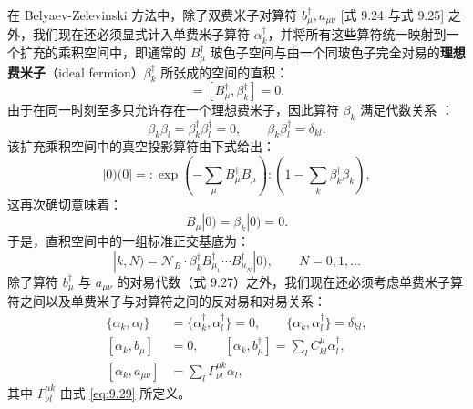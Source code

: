 在 Belyaev-Zelevinski 方法中，除了双费米子对算符 $b^{\dagger}_{\mu},a_{\mu\nu}$
{[}式 9.24 与式 9.25{]} 之外，我们现在还必须显式计入单费米子算符 $\alpha^{\dagger}_{k}$，并将所有这些算符统一映射到一个扩充的乘积空间中，即通常的
$B^{\dagger}_{\mu}$ 玻色子空间与由一个同玻色子完全对易的\textbf{理想费米子}（ideal fermion）$\beta^{\dagger}_{k}$
所张成的空间的直积：
\begin{equation}
[B_{\mu},\beta^{\dagger}_{k}]=[B^{\dagger}_{\mu},\beta^{\dagger}_{k}]=0.\label{eq:9.124}
\end{equation}
由于在同一时刻至多只允许存在一个理想费米子，因此算符 $\beta_{k}$ 满足代数关系 \cite{Ok74}：
\begin{equation}
\beta_{k}\beta_{l}=\beta^{\dagger}_{k}\beta^{\dagger}_{l}=0,\qquad\beta_{k}\beta^{\dagger}_{l}=\delta_{kl}.\label{eq:9.125}
\end{equation}
该扩充乘积空间中的真空投影算符由下式给出：
\begin{equation}
|0)(0|={:}\exp\left(-\sum_{\mu}B^{\dagger}_{\mu}B_{\mu}\right){:}\left(1-\sum_{k}\beta^{\dagger}_{k}\beta_{k}\right),\label{eq:9.126}
\end{equation}
这再次确切意味着：
\begin{equation}
B_{\mu}|0)=\beta_{k}|0)=0.\label{eq:9.127}
\end{equation}
于是，直积空间中的一组标准正交基底为：
\begin{equation}
|k,N)=\mathscr{N}_{B}\cdot\beta^{\dagger}_{k}B^{\dagger}_{\mu_{1}}\cdots B^{\dagger}_{\mu_{N}}|0),\qquad N=0,1,\ldots\label{eq:9.128}
\end{equation}
除了算符 $b^{\dagger}_{\mu}$ 与 $a_{\mu\nu}$ 的对易代数（式 9.27）之外，我们现在还必须考虑单费米子算符之间以及单费米子与对算符之间的反对易和对易关系：
\begin{align}
\{\alpha_{k},\alpha_{l}\} & =\{\alpha^{\dagger}_{k},\alpha^{\dagger}_{l}\}=0,\qquad\{\alpha_{k},\alpha^{\dagger}_{l}\}=\delta_{kl},\nonumber \\{}
[\alpha_{k},b_{\mu}] & =0,\qquad[\alpha_{k},b^{\dagger}_{\mu}]=\sum_{l}C^{\mu}_{kl}\alpha^{\dagger}_{l},\label{eq:9.129}\\{}
[\alpha_{k},a_{\mu\nu}] & =\sum_{l}\Gamma^{\mu k}_{\nu l}\alpha_{l},\nonumber 
\end{align}
其中 $\Gamma^{\mu k}_{\nu l}$ 由式 \ref{eq:9.29} 所定义。

